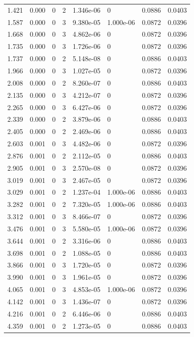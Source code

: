 \documentclass[preview]{standalone}
\begin{document}
{{\begin{tabular}{L{1.2cm}C{1.2cm} C{0.3cm}C{0.5cm} C{1.4cm}C{1.4cm} C{1.4cm}C{1.4cm}}
  1.421  &  0.000  & 0     &  2 &  1.346e-06  & 0  & 0.0886 &  0.0403   \\ 
  1.587  &  0.000  & 0     &  3 &  9.380e-05  & 1.000e-06  & 0.0872 &  0.0396   \\ 
  1.668  &  0.000  & 0     &  3 &  4.862e-06  & 0  & 0.0872 &  0.0396   \\ 
  1.735  &  0.000  & 0     &  3 &  1.726e-06  & 0  & 0.0872 &  0.0396   \\ 
  1.737  &  0.000  & 0     &  2 &  5.148e-08  & 0  & 0.0886 &  0.0403   \\ 
  1.966  &  0.000  & 0     &  3 &  1.027e-05  & 0  & 0.0872 &  0.0396   \\ 
  2.008  &  0.000  & 0     &  2 &  8.260e-07  & 0  & 0.0886 &  0.0403   \\ 
  2.135  &  0.000  & 0     &  3 &  4.212e-07  & 0  & 0.0872 &  0.0396   \\ 
  2.265  &  0.000  & 0     &  3 &  6.427e-06  & 0  & 0.0872 &  0.0396   \\ 
  2.339  &  0.000  & 0     &  2 &  3.879e-06  & 0  & 0.0886 &  0.0403   \\ 
  2.405  &  0.000  & 0     &  2 &  2.469e-06  & 0  & 0.0886 &  0.0403   \\ 
  2.603  &  0.001  & 0     &  3 &  4.482e-06  & 0  & 0.0872 &  0.0396   \\ 
  2.876  &  0.001  & 0     &  2 &  2.112e-05  & 0  & 0.0886 &  0.0403   \\ 
  2.905  &  0.001  & 0     &  3 &  2.570e-08  & 0  & 0.0872 &  0.0396   \\ 
  3.019  &  0.001  & 0     &  3 &  2.467e-05  & 0  & 0.0872 &  0.0396   \\ 
  3.029  &  0.001  & 0     &  2 &  1.237e-04  & 1.000e-06  & 0.0886 &  0.0403   \\ 
  3.282  &  0.001  & 0     &  2 &  7.320e-05  & 1.000e-06  & 0.0886 &  0.0403   \\ 
  3.312  &  0.001  & 0     &  3 &  8.466e-07  & 0  & 0.0872 &  0.0396   \\ 
  3.476  &  0.001  & 0     &  3 &  5.580e-05  & 1.000e-06  & 0.0872 &  0.0396   \\ 
  3.644  &  0.001  & 0     &  2 &  3.316e-06  & 0  & 0.0886 &  0.0403   \\ 
  3.698  &  0.001  & 0     &  2 &  1.088e-05  & 0  & 0.0886 &  0.0403   \\ 
  3.866  &  0.001  & 0     &  3 &  1.720e-05  & 0  & 0.0872 &  0.0396   \\ 
  3.990  &  0.001  & 0     &  3 &  1.961e-05  & 0  & 0.0872 &  0.0396   \\ 
  4.065  &  0.001  & 0     &  3 &  4.853e-05  & 1.000e-06  & 0.0872 &  0.0396   \\ 
  4.142  &  0.001  & 0     &  3 &  1.436e-07  & 0  & 0.0872 &  0.0396   \\ 
  4.216  &  0.001  & 0     &  2 &  6.446e-06  & 0  & 0.0886 &  0.0403   \\ 
  4.359  &  0.001  & 0     &  2 &  1.273e-05  & 0  & 0.0886 &  0.0403   \\ 
\hline 
\end{tabular} 

}}
\end{document}
